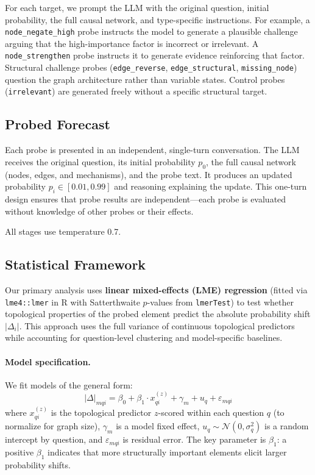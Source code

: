 \documentclass[11pt]{article}
\begin{document}
For each target, we prompt the LLM with the original question, initial probability, the full causal network, and type-specific instructions. For example, a \texttt{node\_negate\_high} probe instructs the model to generate a plausible challenge arguing that the high-importance factor is incorrect or irrelevant. A \texttt{node\_strengthen} probe instructs it to generate evidence reinforcing that factor. Structural challenge probes (\texttt{edge\_reverse}, \texttt{edge\_structural}, \texttt{missing\_node}) question the graph architecture rather than variable states. Control probes (\texttt{irrelevant}) are generated freely without a specific structural target.


\subsection{Probed Forecast}
\label{sec:probed}

Each probe is presented in an independent, single-turn conversation. The LLM receives the original question, its initial probability $p_0$, the full causal network (nodes, edges, and mechanisms), and the probe text. It produces an updated probability $p_i \in [0.01, 0.99]$ and reasoning explaining the update. This one-turn design ensures that probe results are independent---each probe is evaluated without knowledge of other probes or their effects.

All stages use temperature 0.7.

\subsection{Statistical Framework}
\label{sec:metrics}

Our primary analysis uses \textbf{linear mixed-effects (LME) regression} (fitted via \texttt{lme4::lmer} in R with Satterthwaite $p$-values from \texttt{lmerTest}) to test whether topological properties of the probed element predict the absolute probability shift $|\Delta_i|$. This approach uses the full variance of continuous topological predictors while accounting for question-level clustering and model-specific baselines.

\paragraph{Model specification.}
We fit models of the general form:
\begin{equation}
    |\Delta|_{mqi} = \beta_0 + \beta_1 \cdot x_{qi}^{(z)} + \gamma_m + u_q + \varepsilon_{mqi}
\end{equation}
where $x_{qi}^{(z)}$ is the topological predictor $z$-scored within each question $q$ (to normalize for graph size), $\gamma_m$ is a model fixed effect, $u_q \sim \mathcal{N}(0, \sigma_q^2)$ is a random intercept by question, and $\varepsilon_{mqi}$ is residual error. The key parameter is $\beta_1$: a positive $\beta_1$ indicates that more structurally important elements elicit larger probability shifts.
\end{document}
